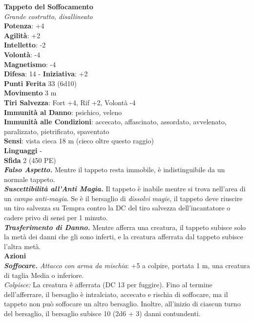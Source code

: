 \begin{multicols}{2}
\medskip\textbf{Tappeto del Soffocamento}\\
\emph{Grande costrutto, disallineato}\\
\textbf{Potenza}: +4\\
\textbf{Agilità}: +2\\
\textbf{Intelletto}: -2\\
\textbf{Volontà}: -4\\
\textbf{Magnetismo}: -4\\
\textbf{Difesa}: 14 - \textbf{Iniziativa}: +2\\
\textbf{Punti Ferita} 33 (6d10)\\
\textbf{Movimento} 3 m\\
\textbf{Tiri Salvezza}: Fort +4, Rif +2, Volontà -4\\
\textbf{Immunità al Danno}: psichico, veleno\\
\textbf{Immunità alle Condizioni}: accecato, affascinato, assordato, avvelenato, paralizzato, pietrificato, spaventato\\
\textbf{Sensi}: vista cieca 18 m (cieco oltre questo raggio)\\
\textbf{Linguaggi} -\\
\textbf{Sfida} 2 (450 PE)\smallskip\\
\emph{\textbf{Falso Aspetto.}} Mentre il tappeto resta immobile, è indistinguibile da un normale tappeto.\\

\emph{\textbf{Suscettibilità all'Anti Magia.}} Il tappeto è inabile mentre si trova nell'area di un \emph{campo anti-magia}. Se è il bersaglio di \emph{dissolvi} \emph{magie}, il tappeto deve riuscire un tiro salvezza su Tempra contro la DC del tiro salvezza dell'incantatore o cadere privo di sensi per 1 minuto.\\

\emph{\textbf{Trasferimento di Danno.}} Mentre afferra una creatura, il tappeto subisce solo la metà dei danni che gli sono inferti, e la creatura afferrata dal tappeto subisce l'altra metà.\\

\smallskip\textbf{Azioni}\\

\emph{\textbf{Soffocare.} Attacco con arma da mischia}: +5 a colpire, portata 1 m, una creatura di taglia Media o inferiore.\\

\emph{Colpisce:} La creatura è afferrata (DC 13 per fuggire). Fino al termine dell'afferrare, il bersaglio è intralciato, accecato e rischia di soffocare, ma il tappeto non può soffocare un altro bersaglio. Inoltre, all'inizio di ciascun turno del bersaglio, il bersaglio subisce 10 (2d6 + 3) danni contundenti. 


\end{multicols}
